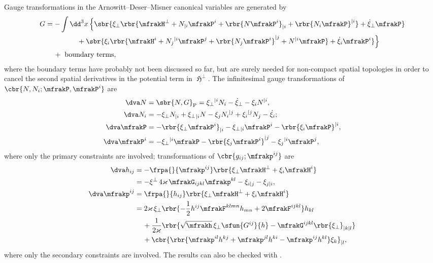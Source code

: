 \documentclass[a4paper,11pt]{article}
\begin{document}
Gauge transformations in the Arnowitt--Deser--Misner canonical variables are 
generated by \cite{Castellani1982} 
\begin{align}
G &= -\int\dd^3 x\,\Big\{ \sbr{
	\xi_\perp \rbr{
		\mfrakH^\perp + N_{|i} \mfrakP^i + \rbr{N\mfrakP^i}_{|i} + 
			\rbr{N_i \mfrakP}^{|i}} +
	\dot{\xi}_\perp \mfrakP}
\nonumber \\
&\qquad\qquad\ \,+ \sbr{
	\xi_i \rbr{
		\mfrakH^i + N_j{}^{|i} \mfrakP^j + \rbr{N_j \mfrakP^i}^{|j} + N^{|i} 
\mfrakP} +
	\dot{\xi}_i \mfrakP^i} \Big\}
\nonumber \\
&\quad\,
+\text{ boundary terms},
\end{align}
where the boundary terms have probably not been discussed so far, but are 
surely needed for non-compact spatial topologies in order to cancel the second 
spatial derivatives in the potential term in $\mfrakH^\perp$. The infinitesimal 
gauge transformations of $\cbr{N, N_i; \mfrakP, \mfrakP^i}$ are 
\cite{Kiriushcheva2008}
\begin{align}
\dva N &= \sbr{N, G}_\text{P} = 
\xi_\perp{}^{|i} N_i - \dot{\xi}_\perp - \xi_i N^{|i},
\label{eq:var-Np} \\
\dva N_i &= %
- \xi_\perp N_{|i} + \xi_\perp{}_{|i} N
- \xi_j N_{i}{}^{|j} + \xi_i{}^{|j} N_j - \dot{\xi}_i;
\label{eq:var-Ni} \\
\dva \mfrakP &= -\rbr{\xi_\perp \mfrakP^i}_{|i} - \xi_\perp{}_{|i} \mfrakP^i
- \rbr{\xi_i \mfrakP}^{|i},
\label{eq:var-Pp} \\
\dva \mfrakP^i &= -\xi_\perp{}^{|i} \mfrakP
- \rbr{\xi_j \mfrakP^i}^{|j} - \xi_j{}^{|i}\mfrakP^j,
\label{eq:var-Pi}
\end{align}
where only the primary constraints are involved; transformations of 
$\cbr{g_{ij}; \mfrakp^{ij}}$ are
\begin{align}
\dva h_{ij} &= -\frpa{}{\mfrakp^{ij}}
\rbr{\xi_\perp \mfrakH^\perp + \xi_i \mfrakH^i}
\nonumber \\
&= -\xi^\perp\,4\varkappa\,\mfrakG_{ijkl}\mfrakp^{kl}
- \xi_{i|j} - \xi_{j|i},
\label{eq:var-hij}
\\
\dva \mfrakp^{ij} &= \frpa{}{h_{ij}}
\rbr{\xi_\perp \mfrakH^\perp + \xi_i \mfrakH^i}
\nonumber \\
&=
2\varkappa\,\xi_\perp\rbr{ -\frac{1}{2}h^{ij} \mfrakF^{klmn} h_{mn}
+ 2 \mfrakF^{ijkl}} h_{kl}
\nonumber \\
&\quad\,
+\frac{1}{2\varkappa}
\rbr{ \sqrt{\mfrakh}\,\xi_\perp\sfun{G^{ij}}{h}
-\mfrakG^{ijkl}\rbr{\xi_{\perp}}_{|k|l}}
\nonumber \\
&\quad\,
+\cbr{\rbr{\mfrakp^{il}h^{kj}+\mfrakp^{jl}h^{ki}
-\mfrakp^{ij}h^{kl}}\xi_k}_{|l},
\label{eq:var-pij}
\end{align}
where
only the secondary constraints are involved. The results can also be checked 
with \cite[ch.\ 4.2.7]{Poisson2004}.
\end{document}
